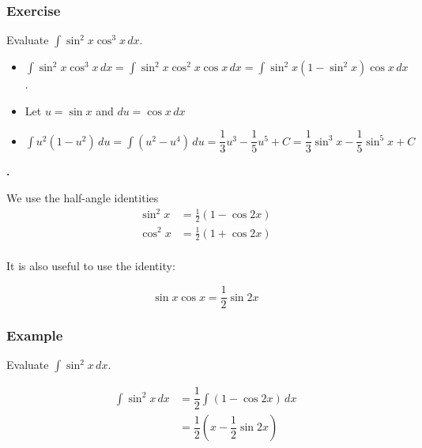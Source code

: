 \documentclass[t]{beamer}
\theoremstyle{plain}
\theoremstyle{definition}
\newcommand{\ds}{\displaystyle}
\newcounter{heading}
\newcommand{\newhead}[1]{\medskip\stepcounter{heading}\noindent\textbf{\hspace{0.2cm}{#1}.}}
\begin{document}
\begin{frame}
\frametitle{Exercise} 

Evaluate $\ds\int\sin^2x\cos^3x\,dx$. \pause

\begin{itemize}
	\item $\ds\int\sin^2x\cos^3x\,dx = \ds\int\sin^2x\cos^2x \cos{x}\,dx = \ds\int\sin^2x (1 - \sin^2x) \cos{x}\,dx$.
	\item Let $u = \sin{x}$ and $du = \cos{x} \,dx$
	\item $\ds\int u^2 (1-u^2) \,du = \ds\int(u^2 - u^4) \, du = \dfrac{1}{3}u^3 - \dfrac{1}{5}u^5 + C = \dfrac{1}{3}\sin^3{x} - \dfrac{1}{5}\sin^5{x} + C$
\end{itemize}

\end{frame}

\begin{frame}
\newhead{Case 2: Integrals where both powers of $\sin x$ and $\cos x$ are even}

We use the half-angle identities
\begin{align*}
\sin^2x&=\tfrac{1}{2}(1-\cos2x)\\
\cos^2x&=\tfrac{1}{2}(1+\cos2x)\\ 
\end{align*}

It is also useful to use the identity:

$$\sin{x}\cos{x} = \dfrac{1}{2}\sin{2x}$$

\end{frame}

\begin{frame}
\frametitle{Example} 

Evaluate $\ds\int\sin^2x\,dx$.  \pause

\begin{align*}
\ds\int\sin^2x\,dx &= \dfrac{1}{2} \int (1 - \cos{2x}) \,dx\\
                               &= \dfrac{1}{2} (x - \dfrac{1}{2}\sin{2x})
\end{align*}

\end{frame}
\end{document}
